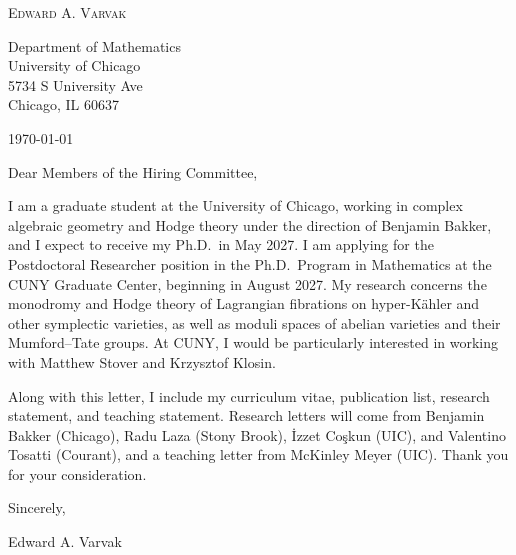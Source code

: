 \documentclass[12pt]{article}
\begin{document}
\begin{center}
  {\Large\textsc{Edward A. Varvak}}\\[10pt]
\end{center}

Department of Mathematics \\
University of Chicago \\
5734 S University Ave \\
Chicago, IL 60637

\today

Dear Members of the Hiring Committee,

I am a graduate student at the University of Chicago, working in complex
algebraic geometry and Hodge theory under the direction of Benjamin Bakker,
and I expect to receive my Ph.D.\ in May 2027. I am applying for the
Postdoctoral Researcher position in the Ph.D.\ Program in Mathematics at the
CUNY Graduate Center, beginning in August 2027. My research concerns the
monodromy and Hodge theory of Lagrangian fibrations on hyper-K\"ahler and
other symplectic varieties, as well as moduli spaces of abelian varieties and
their Mumford--Tate groups. At CUNY, I would be particularly interested in
working with Matthew Stover and Krzysztof Klosin.

Along with this letter, I include my curriculum vitae, publication list,
research statement, and teaching statement. Research letters will come from
Benjamin Bakker (Chicago), Radu Laza (Stony Brook), \.{I}zzet Co\c{s}kun
(UIC), and Valentino Tosatti (Courant), and a teaching letter from McKinley
Meyer (UIC). Thank you for your consideration.

Sincerely,

Edward A. Varvak
\end{document}

